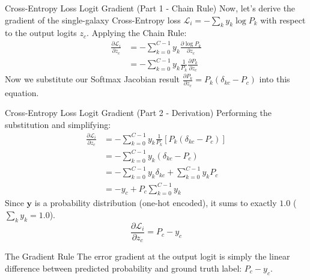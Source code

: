 \documentclass[9pt]{beamer}
\begin{document}
\begin{frame}{Cross-Entropy Loss Logit Gradient (Part 1 - Chain Rule)}
  Now, let's derive the gradient of the single-galaxy Cross-Entropy loss $\mathcal{L}_i = - \sum_{k} y_k \log P_k$ with respect to the output logits $z_c$.
  Applying the Chain Rule:
  \begin{align*}
    \frac{\partial \mathcal{L}_i}{\partial z_c} &= - \sum_{k=0}^{C-1} y_k \frac{\partial \log P_k}{\partial z_c} \\
    &= - \sum_{k=0}^{C-1} y_k \frac{1}{P_k} \frac{\partial P_k}{\partial z_c}
  \end{align*}
  Now we substitute our Softmax Jacobian result $\frac{\partial P_k}{\partial z_c} = P_k (\delta_{kc} - P_c)$ into this equation.
\end{frame}

\begin{frame}{Cross-Entropy Loss Logit Gradient (Part 2 - Derivation)}
  Performing the substitution and simplifying:
  \begin{align*}
    \frac{\partial \mathcal{L}_i}{\partial z_c} &= - \sum_{k=0}^{C-1} y_k \frac{1}{P_k} \left[ P_k (\delta_{kc} - P_c) \right] \\
    &= - \sum_{k=0}^{C-1} y_k (\delta_{kc} - P_c) \\
    &= - \sum_{k=0}^{C-1} y_k \delta_{kc} + \sum_{k=0}^{C-1} y_k P_c \\
    &= - y_c + P_c \sum_{k=0}^{C-1} y_k
  \end{align*}
  Since $\mathbf{y}$ is a probability distribution (one-hot encoded), it sums to exactly $1.0$ ($\sum_{k} y_k = 1.0$).
  $$\frac{\partial \mathcal{L}_i}{\partial z_c} = P_c - y_c$$
  \begin{alertblock}{The Gradient Rule}
    The error gradient at the output logit is simply the linear difference between predicted probability and ground truth label: $P_c - y_c$.
  \end{alertblock}
\end{frame}
\end{document}
